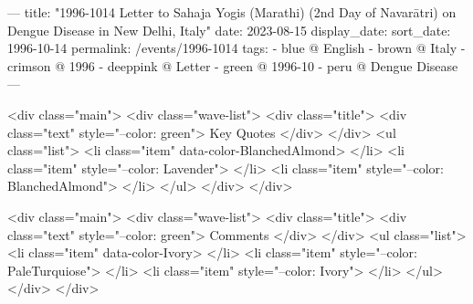 ---
title: "1996-1014 Letter to Sahaja Yogis (Marathi) (2nd Day of Navarātri) on Dengue Disease in New Delhi, Italy"
date: 2023-08-15
display_date: 
sort_date: 1996-10-14
permalink: /events/1996-1014
tags:
  - blue @ English
  - brown @ Italy
  - crimson @ 1996
  - deeppink @ Letter
  - green @ 1996-10
  - peru @ Dengue Disease
---

<div class="main">
  <div class="wave-list">
    <div class="title">
      <div class="text" style="--color: green">
        Key Quotes
      </div>
    </div>
    <ul class="list">
        <li class="item" data-color-BlanchedAlmond>
        </li>
        <li class="item" style="--color: Lavender">
        </li>
        <li class="item" style="--color: BlanchedAlmond">
        </li>
      </ul>
  </div>
</div>

<div class="main">
  <div class="wave-list">
    <div class="title">
      <div class="text" style="--color: green">
        Comments
      </div>
    </div>
    <ul class="list">
        <li class="item" data-color-Ivory>
        </li>
        <li class="item" style="--color: PaleTurquiose">
        </li>
        <li class="item" style="--color: Ivory">
        </li>
      </ul>
  </div>
</div>